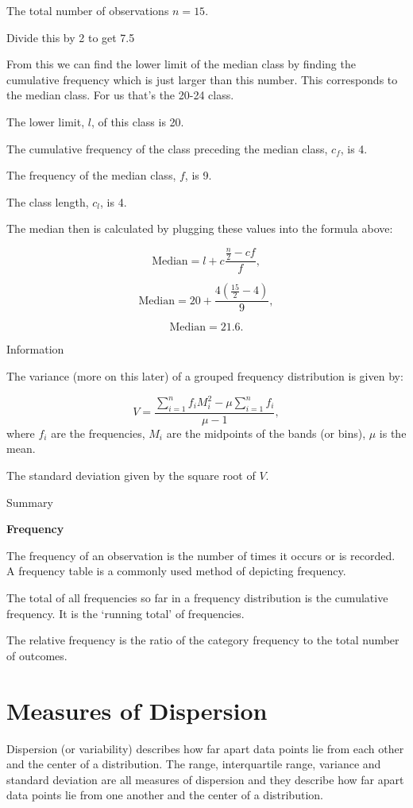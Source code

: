 \documentclass[
]{book}
\begin{document}
The total number of observations \(n = 15\).

Divide this by 2 to get 7.5

From this we can find the lower limit of the median class by finding the cumulative frequency which is just larger than this number. This corresponds to the median class. For us that's the 20-24 class.

The lower limit, \(l\), of this class is 20.

The cumulative frequency of the class preceding the median class, \(c_f\), is 4.

The frequency of the median class, \(f\), is 9.

The class length, \(c_l\), is 4.

The median then is calculated by plugging these values into the formula above:

\[\textrm{Median} = l + c \frac{\frac{n}{2}-cf}{f},\]

\[\textrm{Median} = 20 + \frac{4(\frac{15}{2}-4)}{9}, \]

\[\textrm{Median} =21.6.\]

Information

The variance (more on this later) of a grouped frequency distribution is given by:

\[ V=\frac{\sum_{i=1}^n f_i M_i^2 - \mu \sum_{i=1}^n f_i}{\mu -1},
 \]
where \(f_i\) are the frequencies, \(M_i\) are the midpoints of the bands (or bins), \(\mu\) is the mean.

The standard deviation given by the square root of \(V\).

Summary

\textbf{Frequency}

The frequency of an observation is the number of times it occurs or is recorded. A frequency table is a commonly used method of depicting frequency.

The total of all frequencies so far in a frequency distribution is the cumulative frequency. It is the `running total' of frequencies.

The relative frequency is the ratio of the category frequency to the total number of outcomes.

\hypertarget{measures-of-dispersion}{%
\section{Measures of Dispersion}\label{measures-of-dispersion}}

Dispersion (or variability) describes how far apart data points lie from each other and the center of a distribution. The range, interquartile range, variance and standard deviation are all measures of dispersion and they describe how far apart data points lie from one another and the center of a distribution.
\end{document}
